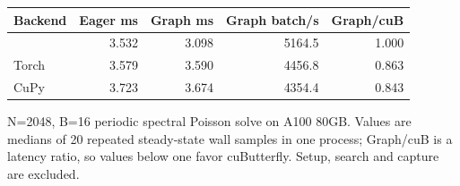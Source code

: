 \begingroup
\scriptsize
\setlength{\tabcolsep}{4pt}
\begin{tabular}{@{}lrrrr@{}}
\toprule
Backend & Eager ms & Graph ms & Graph batch/s & Graph/cuB \\
\midrule
\system{} & 3.532 & 3.098 & 5164.5 & 1.000\\
Torch & 3.579 & 3.590 & 4456.8 & 0.863\\
CuPy & 3.723 & 3.674 & 4354.4 & 0.843\\
\bottomrule
\end{tabular}
\par\smallskip
\parbox{\linewidth}{N=2048, B=16 periodic spectral Poisson solve on A100 80GB. Values are medians of 20 repeated steady-state wall samples in one process; Graph/cuB is a latency ratio, so values below one favor cuButterfly. Setup, search and capture are excluded.}
\endgroup
